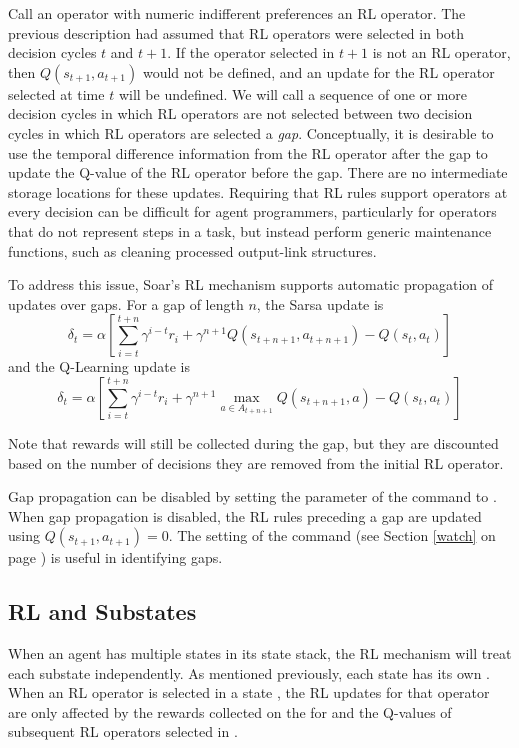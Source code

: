 Call an operator with numeric indifferent preferences an RL operator.
The previous description had assumed that RL operators were selected in both decision cycles $t$ and $t+1$.
If the operator selected in $t+1$ is not an RL operator, then $Q(s_{t+1}, a_{t+1})$ would not be defined, and an update for the RL operator selected at time $t$ will be undefined.
We will call a sequence of one or more decision cycles in which RL operators are not selected between two decision cycles in which RL operators are selected a \emph{gap}.
Conceptually, it is desirable to use the temporal difference information from the RL operator after the gap to update the Q-value of the RL operator before the gap.
There are no intermediate storage locations for these updates.
Requiring that RL rules support operators at every decision can be difficult for agent programmers, particularly for operators that do not represent steps in a task, but instead perform generic maintenance functions, such as cleaning processed output-link structures.

To address this issue, Soar's RL mechanism supports automatic propagation of updates over gaps.
For a gap of length $n$, the Sarsa update is
$$\delta_t = \alpha \left[ \sum_{i=t}^{t+n}{\gamma^{i-t} r_i} + \gamma^{n+1} Q(s_{t+n+1}, a_{t+n+1}) - Q(s_t, a_t) \right]$$
and the Q-Learning update is
$$\delta_t = \alpha \left[ \sum_{i=t}^{t+n}{\gamma^{i-t} r_i} + \gamma^{n+1} \underset{a \in A_{t+n+1}}{\max} Q(s_{t+n+1}, a) - Q(s_t, a_t) \right]$$

Note that rewards will still be collected during the gap, but they are discounted based on the number of decisions they are removed from the initial RL operator.

Gap propagation can be disabled by setting the  parameter of the  command to .
When gap propagation is disabled, the RL rules preceding a gap are updated using $Q(s_{t+1}, a_{t+1}) = 0$.
The  setting of the  command (see Section \ref{watch} on page \pageref{watch}) is useful in identifying gaps.


\subsection{RL and Substates}
\label{RL-substates}

When an agent has multiple states in its state stack, the RL mechanism will treat each substate independently.
As mentioned previously, each state has its own .
When an RL operator is selected in a state , the RL updates for that operator are only affected by the rewards collected on the  for  and the Q-values of subsequent RL operators selected in .

